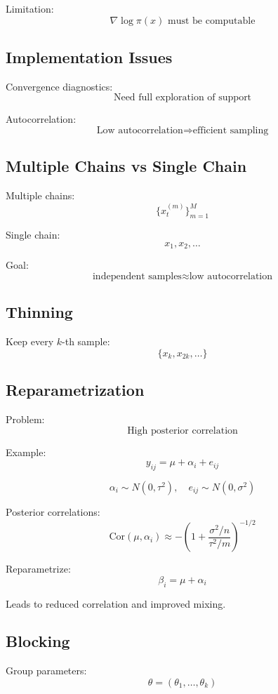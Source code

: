 \documentclass[12pt,oneside]{book}
\numberwithin{equation}{section}
\theoremstyle{definition}
\theoremstyle{plain}
\theoremstyle{remark}
\begin{document}
Limitation:
\[
\nabla \log \pi(x) \text{ must be computable}
\]

\subsection*{Implementation Issues}

Convergence diagnostics:
\[
\text{Need full exploration of support}
\]

Autocorrelation:
\[
\text{Low autocorrelation} \Rightarrow \text{efficient sampling}
\]

\subsection*{Multiple Chains vs Single Chain}

Multiple chains:
\[
\{x^{(m)}_t\}_{m=1}^M
\]

Single chain:
\[
x_1, x_2, \dots
\]

Goal:
\[
\text{independent samples} \approx \text{low autocorrelation}
\]

\subsection*{Thinning}

Keep every $k$-th sample:
\[
\{x_k, x_{2k}, \dots\}
\]

\subsection*{Reparametrization}

Problem:
\[
\text{High posterior correlation}
\]

Example:
\[
y_{ij} = \mu + \alpha_i + e_{ij}
\]

\[
\alpha_i \sim N(0, \tau^2), \quad e_{ij} \sim N(0,\sigma^2)
\]

Posterior correlations:
\[
\text{Cor}(\mu,\alpha_i) \approx -\left(1 + \frac{\sigma^2/n}{\tau^2/m}\right)^{-1/2}
\]

Reparametrize:
\[
\beta_i = \mu + \alpha_i
\]

Leads to reduced correlation and improved mixing.

\subsection*{Blocking}

Group parameters:
\[
\theta = (\theta_1,\dots,\theta_k)
\]
\end{document}
